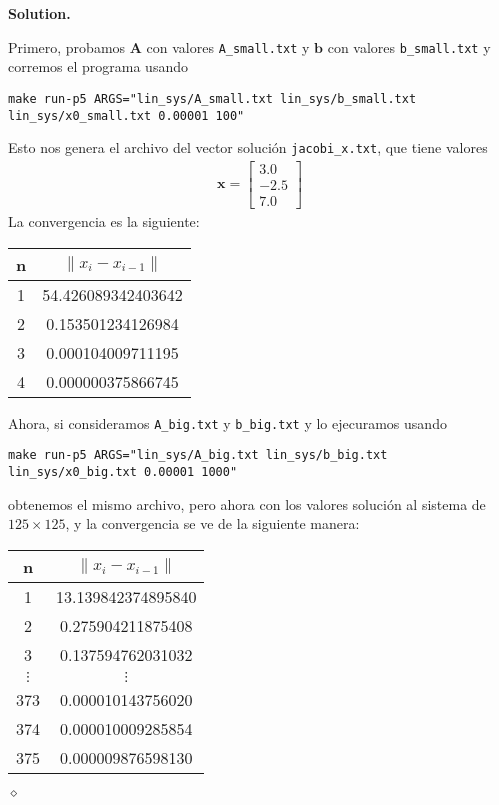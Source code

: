\documentclass{article}
\theoremstyle{problemstyle}
\newenvironment{solution}{%
  \begin{mdframed}[linewidth=0.8pt,linecolor=Gray,backgroundcolor=Gray!5,roundcorner=5pt]%
  \noindent\textbf{Solution.}%
}{%
\hfill $ \diamond $ 
  \end{mdframed}%
}
\begin{document}
\begin{solution}
	Primero, probamos $ \mathbf{A} $ con valores \texttt{A\_small.txt} y $ \mathbf{b} $ con valores \texttt{b\_small.txt} y corremos el programa usando
	\begin{center}
    \texttt{make run-p5 ARGS="lin\_sys/A\_small.txt lin\_sys/b\_small.txt
    lin\_sys/x0\_small.txt 0.00001 100"}
	\end{center}
	Esto nos genera el archivo del vector soluci\'on \texttt{jacobi\_x.txt}, que tiene valores
	\begin{align*}
		\mathbf{x} =
		\begin{bmatrix}
			3.0  \\
			-2.5 \\
			7.0
		\end{bmatrix}
	\end{align*}
	La convergencia es la siguiente:
	\begin{table}[H]
		\begin{center}
			\begin{tabular}[H]{c|c}
				n & $ \lVert x_i - x_{i-1}\rVert $ \\
				\hline
				1 & 54.426089342403642             \\
				2 & 0.153501234126984              \\
				3 & 0.000104009711195              \\
				4 & 0.000000375866745
			\end{tabular}
		\end{center}
	\end{table}

	Ahora, si consideramos \texttt{A\_big.txt} y \texttt{b\_big.txt} y lo ejecuramos usando
	\begin{center}
		\texttt{make run-p5 ARGS="lin\_sys/A\_big.txt lin\_sys/b\_big.txt lin\_sys/x0\_big.txt 0.00001 1000"}
	\end{center}
	obtenemos el mismo archivo, pero ahora con los valores soluci\'on al sistema
	de $ 125\times 125 $, y la convergencia se ve de la siguiente manera:
	\begin{table}[H]
		\begin{center}
			\begin{tabular}[H]{c|c}
				n        & $ \lVert x_i - x_{i-1}\rVert $ \\
				\hline
				1        & 13.139842374895840             \\
				2        & 0.275904211875408              \\
				3        & 0.137594762031032              \\
				$\vdots$ & $ \vdots $                     \\
				373      & 0.000010143756020              \\
				374      & 0.000010009285854              \\
				375      & 0.000009876598130              \\
			\end{tabular}
		\end{center}
	\end{table}

\end{solution}
\end{document}
